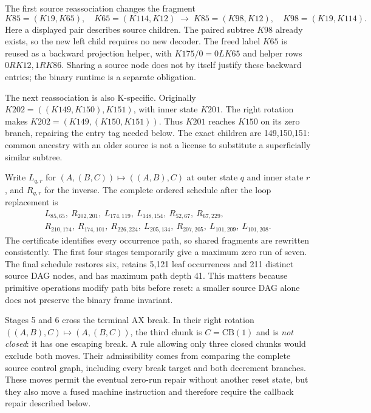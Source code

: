 The first source reassociation changes the fragment
\[
 K85=(K19,K65),\quad K65=(K114,K12)
 \;\longrightarrow\;
 K85=(K98,K12),\quad K98=(K19,K114).
\]
Here a displayed pair describes source children.  The paired subtree
$K98$ already exists, so the new left child requires no new decoder.
The freed label $K65$ is reused as a backward projection helper, with
$K175/0=0LK65$ and helper rows $0RK12,1RK86$.
Sharing a source node does not by itself justify these backward entries;
the binary runtime is a separate obligation.

The next reassociation is also K-specific.  Originally
$K202=((K149,K150),K151)$, with inner state $K201$.
The right rotation makes $K202=(K149,(K150,K151))$.
Thus $K201$ reaches $K150$ on its zero branch, repairing the entry tag
needed below.  The exact children are 149,150,151: common ancestry with
an older source is not a license to substitute a superficially similar
subtree.

Write $L_{q,r}$ for $(A,(B,C))\mapsto((A,B),C)$ at outer state $q$
and inner state $r$, and $R_{q,r}$ for the inverse.  The complete ordered
schedule after the loop replacement is
\[
\begin{gathered}
 L_{85,65},\ R_{202,201},\ L_{174,119},\ L_{148,154},\
 R_{52,67},\ R_{67,229},\\
 R_{210,174},\ R_{174,101},\ R_{226,224},\ L_{205,134},\
 R_{207,205},\ L_{101,209},\ L_{101,208}.
\end{gathered}
\]
The certificate identifies every occurrence path, so shared fragments
are rewritten consistently.  The first four stages temporarily give a
maximum zero run of seven.  The final schedule restores six, retains
5,121 leaf occurrences and 211 distinct source DAG nodes, and has maximum
path depth 41.  This matters because primitive operations modify path
bits before reset: a smaller source DAG alone does not preserve the
binary frame invariant.

Stages 5 and 6 cross the terminal AX break.  In their right rotation
$((A,B),C)\mapsto(A,(B,C))$, the third chunk is
$C=\mathrm{CB}(1)$ and is \emph{not closed}: it has one escaping break.
A rule allowing only three closed chunks would exclude both moves.
Their admissibility comes from comparing the complete source control
graph, including every break target and both decrement branches.
These moves permit the eventual zero-run repair without another reset
state, but they also move a fused machine instruction and therefore
require the callback repair described below.

